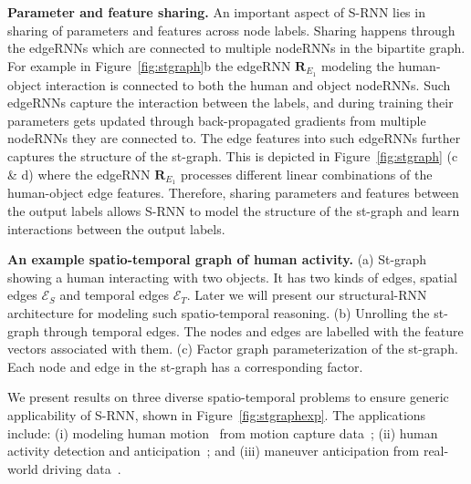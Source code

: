 \documentclass[10pt,twocolumn,letterpaper]{article}
\newcommand{\ve}[1]{\mathbf{#1}}
\newcommand{\mcal}[1]{\mathcal{#1}}
\begin{document}
\textbf{Parameter and feature sharing.} An important aspect of S-RNN lies in sharing of parameters and features across node labels. Sharing happens through the edgeRNNs which are connected to multiple nodeRNNs in the bipartite graph. For example in Figure~\ref{fig:stgraph}b the edgeRNN $\ve{R}_{E_1}$ modeling the human-object interaction is connected to both the human and object nodeRNNs. Such edgeRNNs capture the interaction between the labels, and during training their parameters gets updated through back-propagated gradients from multiple nodeRNNs they are connected to. The edge features into such edgeRNNs further captures the structure of the st-graph. This is depicted in Figure~\ref{fig:stgraph} (c \& d) where the edgeRNN $\ve{R}_{E_1}$ processes different linear combinations of the human-object edge features. Therefore, sharing parameters and features between the output labels allows S-RNN to model the structure of the st-graph and learn interactions between the output labels.

\caption{\textbf{An example spatio-temporal graph of human activity.} (a) St-graph showing a human interacting with two objects. It has two kinds of edges, spatial edges $\mcal{E}_S$ and temporal edges $\mcal{E}_T$. Later we will present our structural-RNN architecture for modeling such spatio-temporal reasoning. (b) Unrolling the st-graph through temporal edges. The nodes and edges are labelled with the feature vectors associated with them. (c) Factor graph parameterization of the st-graph. Each node and edge in the st-graph has a corresponding factor.}\fi


We present results on three diverse spatio-temporal problems to ensure generic applicability of S-RNN, shown in Figure~\ref{fig:stgraphexp}. The applications include: (i) modeling human motion~\cite{Fragkiadaki15} from motion capture data~\cite{H36m}; (ii) human activity detection and anticipation~\cite{Koppula13b,Koppula13}; and (iii) maneuver anticipation from real-world driving data~\cite{Jain15}. 
\end{document}
